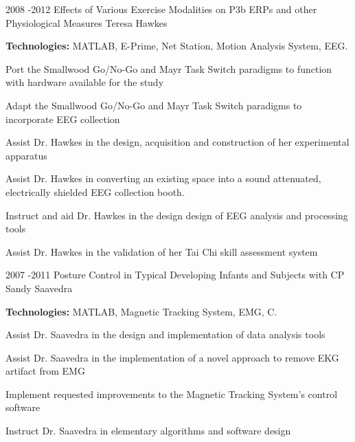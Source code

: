 \documentclass[10pt]{article} %
\begin{document}

\project
{2008 -}{2012}
{Effects of Various Exercise Modalities on P3b ERPs and other Physiological Measures}
{Teresa Hawkes}
{\rule{0mm}{5mm}\textbf{Technologies:} MATLAB, E-Prime, Net Station, Motion Analysis System, EEG.

\begin{itemize-noindent}
\item{Port the Smallwood Go/No-Go and Mayr Task Switch paradigms to function with hardware available for the study}
\item{Adapt the Smallwood Go/No-Go and Mayr Task Switch paradigms to incorporate EEG collection}
\item{Assist Dr. Hawkes in the design, acquisition and construction of her experimental apparatus}
\item{Assist Dr. Hawkes in converting an existing space into a sound attenuated, electrically shielded EEG collection booth.}
\item{Instruct and aid Dr. Hawkes in the design design of EEG analysis and processing tools}
\item{Assist Dr. Hawkes in the validation of her Tai Chi skill assessment system}
\end{itemize-noindent}

}


\project
{2007 -}{2011}
{ Posture Control in Typical Developing Infants and Subjects with CP}
{Sandy Saavedra}
{\rule{0mm}{5mm}\textbf{Technologies:} MATLAB, Magnetic Tracking System, EMG, C.

\begin{itemize-noindent}
\item{Assist Dr. Saavedra in the design and implementation of data analysis tools}
\item{Assist Dr. Saavedra in the implementation of a novel approach to remove EKG artifact from EMG}
\item{Implement requested improvements to the Magnetic Tracking System's control software}
\item{Instruct Dr. Saavedra in elementary algorithms and software design}
\end{itemize-noindent}

}

\end{document}
